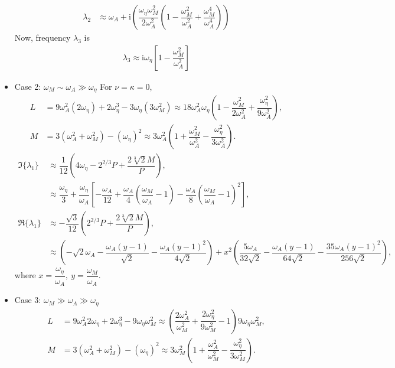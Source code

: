 \documentclass[12pt,psfig]{article}
\begin{document}
\begin{itemize}
\begin{align*}
\lambda_2&\approx \omega_A+\mathrm{i}\left(\dfrac{\omega_\eta \omega_M^2}{2 \omega_A^2}\left(1-\dfrac{ \omega_M^2}{\omega_A^2}+\dfrac{\omega_M^4}{\omega_A^4}\right)\right)
\end{align*}
Now, frequency $\lambda_3$ is
\begin{align*}
\lambda_3\approx \mathrm{i}\omega_\eta\left[1-\dfrac{\omega_M^2}{\omega_A^2}\right]
\end{align*}
\item Case 2: $\omega_M\sim \omega_A\gg \omega_\eta$
For $\nu=\kappa=0$,
\begin{align*}
L&=9 \omega_A^2 (2 \omega_\eta)+2 \omega_\eta^3-3 \omega_\eta \left(3 \omega_M^2\right)\approx 18\omega_A^2\omega_\eta\left(1-\dfrac{\omega_M^2}{2\omega_A^2}+\dfrac{\omega_\eta^2}{9\omega_A^2}\right),\\
M&=3 \left(\omega_A^2+\omega_M^2\right)-(\omega_\eta)^2\approx 3\omega_A^2\left(1+\dfrac{\omega_M^2}{\omega_A^2}-\dfrac{\omega_\eta^2}{3\omega_A^2}\right).
\end{align*}
\begin{align*}
\Im\{\lambda_1\}&\approx \dfrac{1}{12}\left(4\omega_\eta-2^{2/3}P+\dfrac{2\sqrt[3]{2}M}{P}\right),\\
&\approx \dfrac{\omega_\eta}{3}+\dfrac{\omega_\eta}{\omega_A} \left[-\dfrac{\omega_A}{12}+\dfrac{\omega_A}{4}  \left(\dfrac{\omega_M}{\omega_A}-1\right)-\dfrac{\omega_A}{8}  \left(\dfrac{\omega_M}{\omega_A}-1\right)^2\right],\\
\Re\{\lambda_1\}&\approx -\dfrac{\sqrt{3}}{12}\left(2^{2/3}P+\dfrac{2\sqrt[3]{2}M}{P}\right),\\
&\approx \left(-\sqrt{2} \omega_A-\dfrac{\omega_A (y-1)}{\sqrt{2}}-\dfrac{\omega_A (y-1)^2}{4 \sqrt{2}}\right)+x^2 \left(\dfrac{5 \omega_A}{32 \sqrt{2}}-\dfrac{\omega_A (y-1)}{64 \sqrt{2}}-\dfrac{35 \omega_A (y-1)^2}{256 \sqrt{2}}\right),
\end{align*}
where $x=\dfrac{\omega_\eta}{\omega_A}, \ y=\dfrac{\omega_M}{\omega_A}$.
\item Case 3: $\omega_M\gg \omega_A \gg \omega_\eta$
\begin{align*}
L&=9 \omega_A^2 2 \omega_\eta+2 \omega_\eta^3-9 \omega_\eta  \omega_M^2\approx \left(\dfrac{2 \omega_A^2 }{ \omega_M^2}+\dfrac{2 \omega_\eta^2}{9 \omega_M^2}-1\right)9 \omega_\eta  \omega_M^2,\\
M&=3 \left(\omega_A^2+\omega_M^2\right)-(\omega_\eta)^2\approx 3\omega_M^2\left(1+\dfrac{\omega_A^2}{\omega_M^2}-\dfrac{\omega_\eta^2}{3\omega_M^2}\right).
\end{align*}

\end{itemize}
\end{document}
